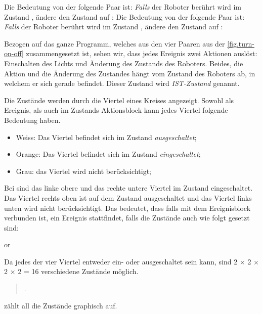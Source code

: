 Die Bedeutung von der folgende Paar ist: \emph{Falls} der Roboter berührt wird
im Zustand , ändere den Zustand auf :
Die Bedeutung von der folgende Paar ist: \emph{Falls} der Roboter berührt wird im Zustand , ändere den Zustand auf : 

Bezogen auf das ganze Programm, welches aus den vier Paaren aus der \cref{fig.turn-on-off}  zusammengesetzt ist, sehen wir, dass jedes Ereignis zwei Aktionen auslöst: Einschalten des Lichts und Änderung des Zustands des Roboters. Beides, die Aktion und die Änderung des Zustandes hängt vom Zustand des Roboters ab, in welchem er sich gerade befindet. Dieser Zustand wird \emph{IST-Zustand} genannt.


Die Zustände werden durch die Viertel eines Kreises angezeigt. Sowohl als Ereignis, als auch im Zustands Aktionsblock kann jedes Viertel folgende Bedeutung haben. 
\begin{itemize}

\item Weiss: Das Viertel befindet sich im Zustand \emph{ausgeschaltet};
\item Orange: Das Viertel befindet sich im Zustand \emph{eingeschaltet};
\item Grau: das Viertel wird nicht berücksichtigt;

\end{itemize}

Bei  sind das linke obere und das rechte untere Viertel im Zustand eingeschaltet. Das Viertel rechts oben ist auf dem Zustand ausgeschaltet und das Viertel links unten wird nicht berücksichtigt. Das bedeutet, dass falls  mit dem Ereignisblock verbunden ist, ein Ereignis stattfindet, falls die Zustände auch wie folgt gesetzt sind:

\begin{center}
\centering {}\quad or \quad {}
\end{center}

Da jedes der vier Viertel entweder ein- oder ausgeschaltet sein kann, sind 2 $\times$ 2 $\times$ 2 $\times$ 2 = 16 verschiedene Zustände möglich.

\begin{quote}
.
\end{quote}
 zählt all die Zustände graphisch auf. 

